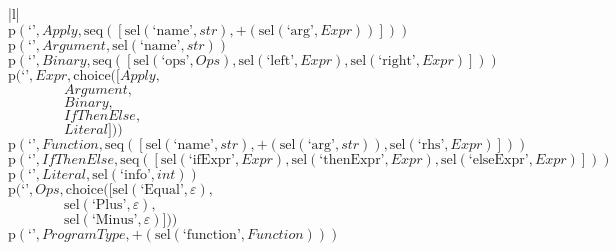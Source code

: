 \footnotesize\begin{center}\begin{tabular}{|l|}\hline
{}
\\\hline
$\mathrm{p}(\text{`'},\mathit{Apply},\mathrm{seq}\left(\left[\mathrm{sel}\left(\text{`name'},str\right), \plus \left(\mathrm{sel}\left(\text{`arg'},\mathit{Expr}\right)\right)\right]\right))$	\\
$\mathrm{p}(\text{`'},\mathit{Argument},\mathrm{sel}\left(\text{`name'},str\right))$	\\
$\mathrm{p}(\text{`'},\mathit{Binary},\mathrm{seq}\left(\left[\mathrm{sel}\left(\text{`ops'},\mathit{Ops}\right), \mathrm{sel}\left(\text{`left'},\mathit{Expr}\right), \mathrm{sel}\left(\text{`right'},\mathit{Expr}\right)\right]\right))$	\\
$\mathrm{p}(\text{`'},\mathit{Expr},\mathrm{choice}([\mathit{Apply},$\\$\qquad\qquad\mathit{Argument},$\\$\qquad\qquad\mathit{Binary},$\\$\qquad\qquad\mathit{IfThenElse},$\\$\qquad\qquad\mathit{Literal}]))$	\\
$\mathrm{p}(\text{`'},\mathit{Function},\mathrm{seq}\left(\left[\mathrm{sel}\left(\text{`name'},str\right), \plus \left(\mathrm{sel}\left(\text{`arg'},str\right)\right), \mathrm{sel}\left(\text{`rhs'},\mathit{Expr}\right)\right]\right))$	\\
$\mathrm{p}(\text{`'},\mathit{IfThenElse},\mathrm{seq}\left(\left[\mathrm{sel}\left(\text{`ifExpr'},\mathit{Expr}\right), \mathrm{sel}\left(\text{`thenExpr'},\mathit{Expr}\right), \mathrm{sel}\left(\text{`elseExpr'},\mathit{Expr}\right)\right]\right))$	\\
$\mathrm{p}(\text{`'},\mathit{Literal},\mathrm{sel}\left(\text{`info'},int\right))$	\\
$\mathrm{p}(\text{`'},\mathit{Ops},\mathrm{choice}([\mathrm{sel}\left(\text{`Equal'},\varepsilon\right),$\\$\qquad\qquad\mathrm{sel}\left(\text{`Plus'},\varepsilon\right),$\\$\qquad\qquad\mathrm{sel}\left(\text{`Minus'},\varepsilon\right)]))$	\\
$\mathrm{p}(\text{`'},\mathit{ProgramType},\plus \left(\mathrm{sel}\left(\text{`function'},\mathit{Function}\right)\right))$	\\
\hline\end{tabular}\end{center}



